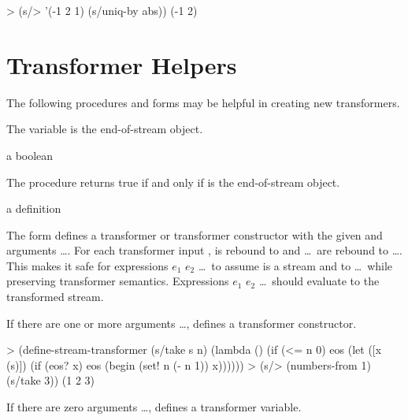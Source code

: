 \codebegin
> (s/> '(-1 2 1) (s/uniq-by abs))
(-1 2)
\codeend

\section {Transformer Helpers}

The following procedures and forms may be helpful in creating new transformers.

\begin{variable}
\end{variable}
\antipar

The  variable is the end-of-stream object.

\begin{procedure}
\end{procedure}
\returns{} a boolean

The  procedure returns true if and only if  is the end-of-stream object.

\begin{syntax}
\end{syntax}
\expandsto{} a definition

The  form defines a transformer or transformer constructor
with the given  and arguments  \ldots. For each transformer input
,  is rebound to  and  \ldots\ are
rebound to  \ldots. This makes it safe for expressions $e_1$ $e_2$ \ldots\ to
assume  is a stream and to   \ldots\ while preserving transformer
semantics. Expressions $e_1$ $e_2$ \ldots\ should evaluate to the transformed stream.

If there are one or more arguments  \ldots, 
defines a transformer constructor.

\codebegin
> (define-stream-transformer (s/take s n)
    (lambda ()
      (if (<= n 0)
          eos
          (let ([x (s)])
            (if (eos? x)
                eos
                (begin
                  (set! n (- n 1))
                  x))))))
> (s/> (numbers-from 1) (s/take 3))
(1 2 3)
\codeend

If there are zero arguments  \ldots,  defines a
transformer variable.

